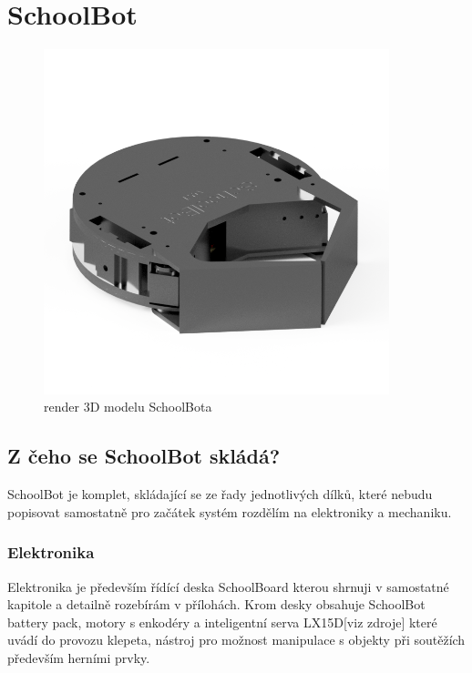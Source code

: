 \documentclass{template/socthesis}
\begin{document}
\chapter{SchoolBot}

\begin{figure}[h]
	\centering
	\includegraphics[width=0.893\textwidth]{img/SchoolBot.png}
	\caption{render 3D modelu SchoolBota}
\end{figure}



\newpage

\section{Z čeho se SchoolBot skládá?}
SchoolBot je komplet, skládající se ze řady jednotlivých dílků, které nebudu popisovat samostatně pro začátek systém rozdělím na elektroniky a mechaniku.




\subsection{Elektronika}

Elektronika je především řídící deska SchoolBoard kterou shrnuji v samostatné kapitole a detailně rozebírám v přílohách. Krom desky obsahuje SchoolBot battery pack, motory s enkodéry a inteligentní serva LX15D[viz zdroje] které uvádí do provozu klepeta, nástroj pro možnost manipulace s objekty při soutěžích především herními prvky.
\end{document}
